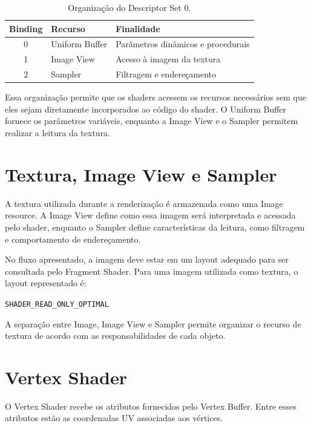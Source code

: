 \begin{table}[H]
    \centering
    \caption{Organização do Descriptor Set 0.}
    \label{tab:descriptor-set}
    \begin{tabular}{c l l}
        \toprule
        \textbf{Binding} & \textbf{Recurso} & \textbf{Finalidade} \\
        \midrule
        0 & Uniform Buffer & Parâmetros dinâmicos e procedurais \\
        1 & Image View & Acesso à imagem da textura \\
        2 & Sampler & Filtragem e endereçamento \\
        \bottomrule
    \end{tabular}
\end{table}

Essa organização permite que os shaders acessem os recursos necessários sem
que eles sejam diretamente incorporados ao código do shader. O Uniform
Buffer fornece os parâmetros variáveis, enquanto a Image View e o Sampler
permitem realizar a leitura da textura.

\section{Textura, Image View e Sampler}

A textura utilizada durante a renderização é armazenada como uma Image
resource. A Image View define como essa imagem será interpretada e acessada
pelo shader, enquanto o Sampler define características da leitura, como
filtragem e comportamento de endereçamento.

No fluxo apresentado, a imagem deve estar em um layout adequado para ser
consultada pelo Fragment Shader. Para uma imagem utilizada como textura, o
layout representado é:

\begin{center}
\texttt{SHADER\_READ\_ONLY\_OPTIMAL}
\end{center}

A separação entre Image, Image View e Sampler permite organizar o recurso de
textura de acordo com as responsabilidades de cada objeto.

\section{Vertex Shader}

O Vertex Shader recebe os atributos fornecidos pelo Vertex Buffer. Entre
esses atributos estão as coordenadas UV associadas aos vértices.

